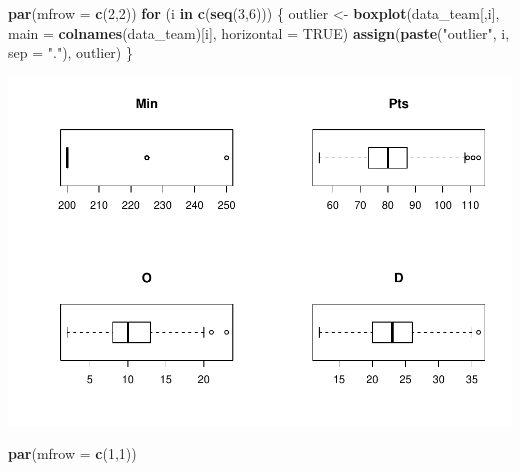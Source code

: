 \documentclass[
]{article}
\newenvironment{Shaded}{\begin{snugshade}}{\end{snugshade}}
\newcommand{\CommentTok}[1]{\textcolor[rgb]{0.56,0.35,0.01}{\textit{#1}}}
\newcommand{\ControlFlowTok}[1]{\textcolor[rgb]{0.13,0.29,0.53}{\textbf{#1}}}
\newcommand{\DataTypeTok}[1]{\textcolor[rgb]{0.13,0.29,0.53}{#1}}
\newcommand{\DecValTok}[1]{\textcolor[rgb]{0.00,0.00,0.81}{#1}}
\newcommand{\FloatTok}[1]{\textcolor[rgb]{0.00,0.00,0.81}{#1}}
\newcommand{\KeywordTok}[1]{\textcolor[rgb]{0.13,0.29,0.53}{\textbf{#1}}}
\newcommand{\NormalTok}[1]{#1}
\newcommand{\OperatorTok}[1]{\textcolor[rgb]{0.81,0.36,0.00}{\textbf{#1}}}
\newcommand{\OtherTok}[1]{\textcolor[rgb]{0.56,0.35,0.01}{#1}}
\newcommand{\StringTok}[1]{\textcolor[rgb]{0.31,0.60,0.02}{#1}}
\begin{document}
\begin{Shaded}
\begin{Highlighting}[]
\KeywordTok{par}\NormalTok{(}\DataTypeTok{mfrow =} \KeywordTok{c}\NormalTok{(}\DecValTok{2}\NormalTok{,}\DecValTok{2}\NormalTok{))}
\ControlFlowTok{for}\NormalTok{ (i }\ControlFlowTok{in} \KeywordTok{c}\NormalTok{(}\KeywordTok{seq}\NormalTok{(}\DecValTok{3}\NormalTok{,}\DecValTok{6}\NormalTok{))) \{}
\NormalTok{  outlier <-}\StringTok{ }\KeywordTok{boxplot}\NormalTok{(data_team[,i], }\DataTypeTok{main =} \KeywordTok{colnames}\NormalTok{(data_team)[i], }\DataTypeTok{horizontal =} \OtherTok{TRUE}\NormalTok{)}
  \KeywordTok{assign}\NormalTok{(}\KeywordTok{paste}\NormalTok{(}\StringTok{"outlier"}\NormalTok{, i, }\DataTypeTok{sep =} \StringTok{"."}\NormalTok{), outlier)}
\NormalTok{\}}
\end{Highlighting}
\end{Shaded}

\includegraphics{practica2_files/figure-latex/unnamed-chunk-21-1.pdf}

\begin{Shaded}
\begin{Highlighting}[]
\KeywordTok{par}\NormalTok{(}\DataTypeTok{mfrow =} \KeywordTok{c}\NormalTok{(}\DecValTok{1}\NormalTok{,}\DecValTok{1}\NormalTok{))}
\end{Highlighting}
\end{Shaded}

\begin{Shaded}
\end{Shaded}
\end{document}

